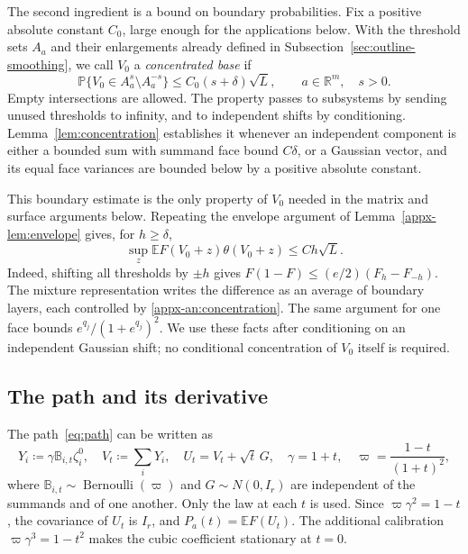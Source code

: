 \documentclass[11pt,letterpaper]{article}
\theoremstyle{remark}
\newcommand{\E}{\mathbb E}
\newcommand{\Pp}{\mathbb P}
\newcommand{\R}{\mathbb R}
\begin{document}
The second ingredient is a bound on boundary probabilities. Fix a
positive absolute constant \(C_0\), large enough for the applications
below. With the
threshold sets \(A_a\) and their enlargements already defined in
Subsection~\ref{sec:outline-smoothing}, we call \(V_0\) a
\emph{concentrated base} if
\begin{equation}
 \Pp\{V_0\in A_a^s\setminus A_a^{-s}\}
 \le C_0(s+\delta)\sqrt L,
 \qquad a\in\R^m,\quad s>0.
 \label{appx-an:concentration}
\end{equation}
Empty intersections are allowed. The property passes to subsystems
by sending unused thresholds to infinity, and to independent shifts
by conditioning. Lemma~\ref{lem:concentration} establishes it whenever an independent component is
either a bounded sum with summand face bound \(C\delta\), or a
Gaussian vector, and its equal face variances are bounded below by
a positive absolute constant.

This boundary estimate is the only property of \(V_0\) needed in the
matrix and surface arguments below. Repeating the envelope argument of
Lemma~\ref{appx-lem:envelope} gives, for \(h\ge\delta\),
\begin{equation}
 \sup_z\E F(V_0+z)\theta(V_0+z)\le Ch\sqrt L.
 \label{appx-an:weight-concentration}
\end{equation}
Indeed, shifting all thresholds by \(\pm h\) gives
\(F(1-F)\le(e/2)(F_h-F_{-h})\). The mixture representation writes
the difference as an average of boundary layers, each controlled by
\eqref{appx-an:concentration}. The same argument for one face bounds
\(e^{q_j}/(1+e^{q_j})^2\). We use these facts after conditioning on
an independent Gaussian shift; no conditional concentration of
\(V_0\) itself is required.

\subsection{The path and its derivative}
\label{appx-an:sec:path}

The path~\eqref{eq:path} can be written as
\begin{equation}
 Y_i\coloneqq \gamma\mathbb B_{i,t}\zeta_i^0,\quad
 V_t\coloneqq \sum_iY_i,\quad U_t=V_t+\sqrt t\,G,
 \quad \gamma=1+t,\quad
 \varpi=\frac{1-t}{(1+t)^2},
 \label{appx-an:path}
\end{equation}
where \(\mathbb B_{i,t}\sim\operatorname{Bernoulli}(\varpi)\)
and \(G\sim N(0,I_r)\) are independent of the summands and of one
another. Only the law at each \(t\) is used. Since
\(\varpi\gamma^2=1-t\), the covariance of \(U_t\)
is \(I_r\), and \(P_a(t)=\E F(U_t)\).
The additional calibration \(\varpi\gamma^3=1-t^2\)
makes the cubic coefficient stationary at \(t=0\).
\end{document}
